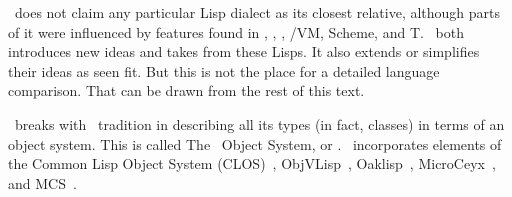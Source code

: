 \begin{introduction}
\begin{optDefinition}
\begin{itemize}
\end{itemize}
%
\eulisp\ does not claim any particular Lisp dialect as its closest relative,
although parts of it were influenced by features found in
\cl{}, \interlisp{},
\lelisp{},
\lisp/VM, Scheme, and
T. \eulisp\ both introduces new ideas and takes from these
Lisps.  It also extends or simplifies their ideas as seen fit.  But this is not
the place for a detailed language comparison.  That can be drawn from the rest
of this text.

\eulisp\ breaks with \lisp\ tradition in describing all its types (in fact,
classes) in terms of an object system.  This is called The \eulisp\ Object
System, or \telos. \telos\ incorporates elements of the Common Lisp Object
System (CLOS)~,
ObjVLisp~,
Oaklisp~,
MicroCeyx~, and
MCS~.
%
\end{optDefinition}

\end{introduction}
